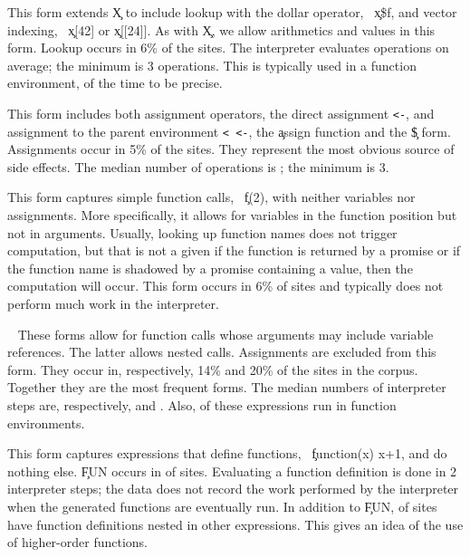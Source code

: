 \documentclass[review,screen,acmsmall,anonymous=true]{acmart}
\begin{document}
\medskip\noindent{} This form extends \c X to include lookup
with the dollar operator, \eg~\c{x\$f}, and vector indexing, \eg~\c{x[42]} or
\c{x[[24]]}. As with \c X, we allow arithmetics and values in this form. Lookup
occurs in 6\% of the sites. The interpreter evaluates
\packageMinimizedmedianoperationsgRnd operations on average; the minimum is 3
operations. This is typically used in a function environment,
\packageMinimizedpercentparentframese of the time to be precise.

\medskip\noindent{} This form includes both assignment
operators, the direct assignment {\tt <-}, and assignment to the parent
environment {\tt <\,\!<-}, the \c{assign} function and the \c{\$} form. Assignments occur in 5\% of the
sites. They represent the most obvious source of side effects. The median number
of operations is \packageMinimizedmedianoperationsiRnd; the minimum is 3.

\medskip\noindent{} This form captures simple function calls,
\eg~\c{f(2)}, with neither variables nor assignments. More specifically, it
allows for variables in the function position but not in arguments. Usually,
looking up function names does not trigger computation, but that is not a given
if the function is returned by a promise or if the function name is shadowed by
a promise containing a value, then the computation will occur. This form occurs in
6\% of sites and typically does not perform much work in the interpreter.

\medskip\noindent{}~ These
forms allow for function calls whose arguments may include variable references.
The latter allows nested calls. Assignments are excluded from this form. They
occur in, respectively, 14\% and 20\% of the sites in the corpus. Together they
are the most frequent forms. The median numbers of interpreter steps are,
respectively, \packageMinimizedmedianoperationsdRnd and
\packageMinimizedmedianoperationsbRnd. Also,  \packageMinimizedpercentparentframesj
of these expressions run in function environments.

\medskip\noindent{} This form captures expressions that define functions, \eg~\c{function(x) x+1}, and do nothing else. \c{FUN} occurs in
\packageFunctionDefinitionSitesPercent of sites. Evaluating a function
definition is done in 2 interpreter steps; the data does not record the work
performed by the interpreter when the generated functions are eventually run. In
addition to \c{FUN}, \packageGeneralizedFunctionDefinitionSitesPercent of sites
have function definitions nested in other expressions. This gives an idea of the
use of higher-order functions.
\end{document}
